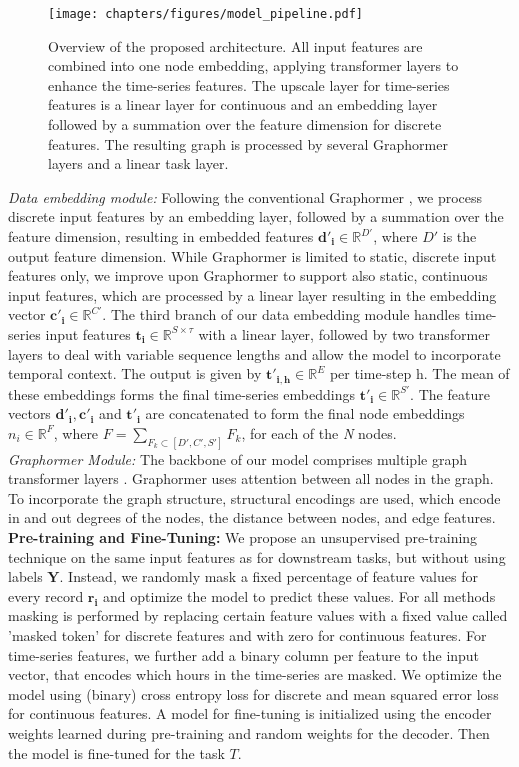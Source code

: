 \documentclass[runningheads]{llncs}
\begin{document}
\begin{figure}[hbt!]
\centering
\texttt{[image: chapters/figures/model\_pipeline.pdf]}
\caption{Overview of the proposed architecture. All input features are combined into one node embedding, applying transformer layers to enhance the time-series features. The upscale layer for time-series features is a linear layer for continuous and an embedding layer followed by a summation over the feature dimension for discrete features. The resulting graph is processed by several Graphormer layers and a linear task layer.}
\label{arch_overview}
\end{figure}
\noindent \textit{Data embedding module:} Following the conventional Graphormer \cite{graphormer}, we process discrete input features by an embedding layer, followed by a summation over the feature dimension, resulting in embedded features $\mathbf{d'_i} \in \mathbb{R}^{D'}$, where $D'$ is the output feature dimension. While Graphormer is limited to static, discrete input features only, we improve upon Graphormer to support also static, continuous input features, which are processed by a linear layer resulting in the embedding vector $\mathbf{c'_i} \in \mathbb{R}^{C'}$. The third branch of our data embedding module handles time-series input features $\mathbf{t_i} \in \mathbb{R}^{S \times \tau}$ with a linear layer, followed by two transformer layers to deal with variable sequence lengths and allow the model to incorporate temporal context. The output is given by $\mathbf{t'_{i,h}} \in \mathbb{R}^{E}$ per time-step h.
The mean of these embeddings forms the final time-series embeddings $\mathbf{t'_i} \in \mathbb{R}^{S'}$. The feature vectors $\mathbf{d'_i}, \mathbf{c'_i}$ and $\mathbf{t'_i}$ are concatenated to form the final node embeddings $n_i \in \mathbb{R}^{F}$, where $F = \sum_{F_k \subset [D', C', S']} F_k$, for each of the \textit{N} nodes.\\
\textit{Graphormer Module:} The backbone of our model comprises multiple graph transformer layers \cite{graphormer}. Graphormer uses attention between all nodes in the graph. To incorporate the graph structure, structural encodings are used, which encode in and out degrees of the nodes, the distance between nodes, and edge features.\\ 
\textbf{Pre-training and Fine-Tuning:} We propose an unsupervised pre-training technique on the same input features as for downstream tasks, but without using labels $\mathbf{Y}$. Instead, we randomly mask a fixed percentage of feature values for every record $\mathbf{r_i}$ and optimize the model to predict these values.  For all methods masking is performed by replacing certain feature values with a fixed value called 'masked token' for discrete features and with zero for continuous features. For time-series features, we further add a binary column per feature to the input vector, that encodes which hours in the time-series are masked. We optimize the model using (binary) cross entropy loss for discrete and mean squared error loss for continuous features. A model for fine-tuning is initialized using the encoder weights learned during pre-training and random weights for the decoder. Then the model is fine-tuned for the task $T$.\\
\end{document}

